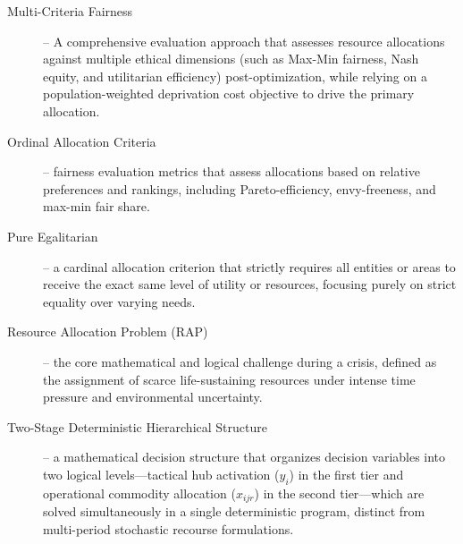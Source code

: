 \begin{description}
\item[Multi-Criteria Fairness] – A comprehensive evaluation approach that assesses resource allocations against multiple ethical dimensions (such as Max-Min fairness, Nash equity, and utilitarian efficiency) post-optimization, while relying on a population-weighted deprivation cost objective to drive the primary allocation.
\item[Ordinal Allocation Criteria] – fairness evaluation metrics that assess allocations based on relative preferences and rankings, including Pareto-efficiency, envy-freeness, and max-min fair share.
\item[Pure Egalitarian] – a cardinal allocation criterion that strictly requires all entities or areas to receive the exact same level of utility or resources, focusing purely on strict equality over varying needs.
\item[Resource Allocation Problem (RAP)] – the core mathematical and logical challenge during a crisis, defined as the assignment of scarce life-sustaining resources under intense time pressure and environmental uncertainty.
\item [Two-Stage Deterministic Hierarchical Structure] – a mathematical decision structure that organizes decision variables into two logical levels—tactical hub activation ($y_i$) in the first tier and operational commodity allocation ($x_{ijr}$) in the second tier—which are solved simultaneously in a single deterministic program, distinct from multi-period stochastic recourse formulations.
\end{description}